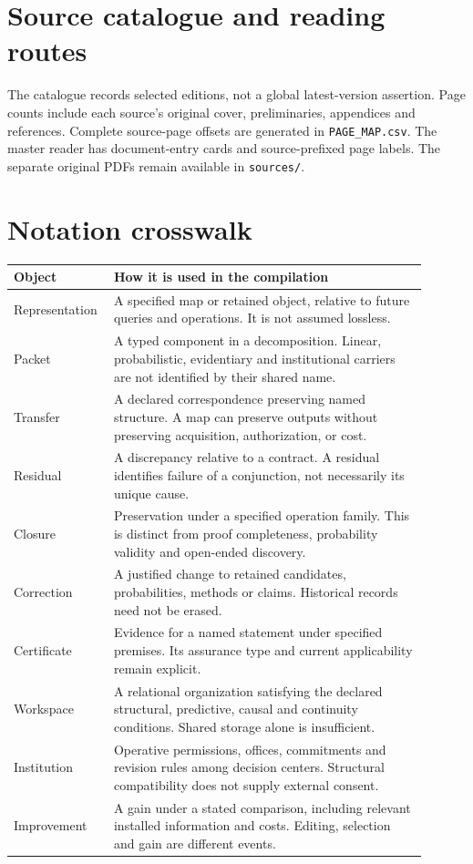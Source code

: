 \documentclass[11pt,oneside]{article}
\begin{document}
\clearpage
\section*{Source catalogue and reading routes}
The catalogue records selected editions, not a global latest-version assertion. Page counts include each source's original cover, preliminaries, appendices and references. Complete source-page offsets are generated in \texttt{PAGE\_MAP.csv}. The master reader has document-entry cards and source-prefixed page labels. The separate original PDFs remain available in \texttt{sources/}.
{\small\setlength{\parskip}{3pt}}

\clearpage
\section*{Notation crosswalk}
\begin{longtable}{@{}p{0.18\linewidth}p{0.72\linewidth}@{}}
\toprule Object & How it is used in the compilation\\\midrule
Representation & A specified map or retained object, relative to future queries and operations. It is not assumed lossless.\\
Packet & A typed component in a decomposition. Linear, probabilistic, evidentiary and institutional carriers are not identified by their shared name.\\
Transfer & A declared correspondence preserving named structure. A map can preserve outputs without preserving acquisition, authorization, or cost.\\
Residual & A discrepancy relative to a contract. A residual identifies failure of a conjunction, not necessarily its unique cause.\\
Closure & Preservation under a specified operation family. This is distinct from proof completeness, probability validity and open-ended discovery.\\
Correction & A justified change to retained candidates, probabilities, methods or claims. Historical records need not be erased.\\
Certificate & Evidence for a named statement under specified premises. Its assurance type and current applicability remain explicit.\\
Workspace & A relational organization satisfying the declared structural, predictive, causal and continuity conditions. Shared storage alone is insufficient.\\
Institution & Operative permissions, offices, commitments and revision rules among decision centers. Structural compatibility does not supply external consent.\\
Improvement & A gain under a stated comparison, including relevant installed information and costs. Editing, selection and gain are different events.\\\bottomrule
\end{longtable}
\end{document}
